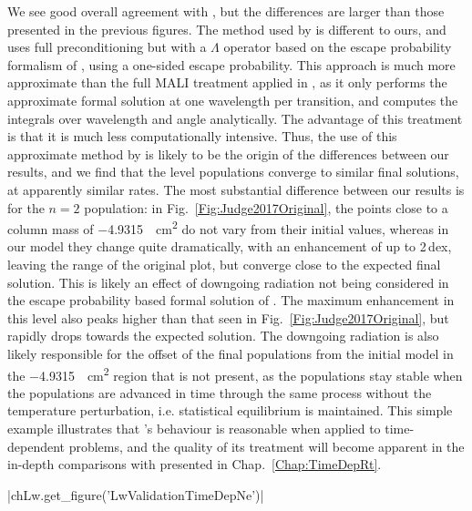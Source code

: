 We see good overall agreement with \citet{Judge2017}, but the differences are larger than those presented in the previous figures.
The method used by \citet{Judge2017} is different to ours, and uses full preconditioning but with a $\Lambda$ operator based on the escape probability formalism of \citet{Hummer1982}, using a one-sided escape probability.
This approach is much more approximate than the full MALI treatment applied in \Lw{}, as it only performs the approximate formal solution at one wavelength per transition, and computes the integrals over wavelength and angle analytically.
The advantage of this treatment is that it is much less computationally intensive.
Thus, the use of this approximate method by \citet{Judge2017} is likely to be the origin of the differences between our results, and we find that the level populations converge to similar final solutions, at apparently similar rates.
The most substantial difference between our results is for the $n=2$ population: in Fig.~\ref{Fig:Judge2017Original}, the points close to a column mass of \SI{-4.9315}{\per\square\centi\metre} do not vary from their initial values, whereas in our model they change quite dramatically, with an enhancement of up to 2\,dex, leaving the range of the original plot, but converge close to the expected final solution.
This is likely an effect of downgoing radiation not being considered in the escape probability based formal solution of \citet{Judge2017}.
The maximum enhancement in this level also peaks higher than that seen in Fig.~\ref{Fig:Judge2017Original}, but rapidly drops towards the expected solution.
The downgoing radiation is also likely responsible for the offset of the final populations from the initial model in the \SI{-4.9315}{\per\square\centi\m} region that is not present, as the populations stay stable when the populations are advanced in time through the same process without the temperature perturbation, i.e. statistical equilibrium is maintained.
This simple example illustrates that \Lw{}'s behaviour is reasonable when applied to time-dependent problems, and the quality of its treatment will become apparent in the in-depth comparisons with \Radyn{} presented in Chap.~\ref{Chap:TimeDepRt}.

\py[Lw]|chLw.get_figure('LwValidationTimeDepNe')|

